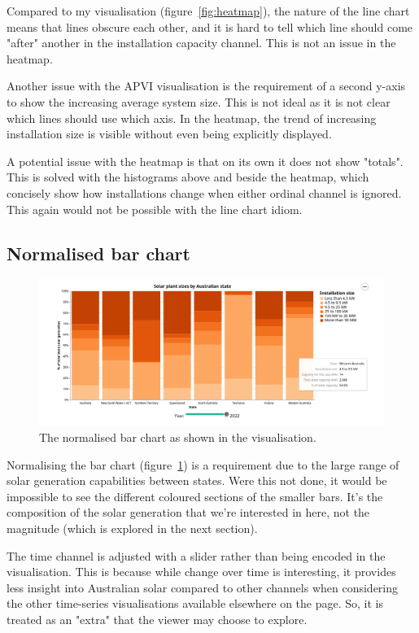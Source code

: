 \documentclass[12pt,letterpaper]{article}
\begin{document}
\begin{multicols}{2}
    Compared to my visualisation (figure~\ref{fig:heatmap}), the nature of the line chart means that lines obscure each other, and it is hard to tell which line should come "after" another in the installation capacity channel. This is not an issue in the heatmap.

    Another issue with the APVI visualisation is the requirement of a second y-axis to show the increasing average system size. This is not ideal as it is not clear which lines should use which axis. In the heatmap, the trend of increasing installation size is visible without even being explicitly displayed.

    A potential issue with the heatmap is that on its own it does not show "totals". This is solved with the histograms above and beside the heatmap, which concisely show how installations change when either ordinal channel is ignored. This again would not be possible with the line chart idiom.

    \subsection*{Normalised bar chart}

    \begin{figure}[H]
        \centering
        \includegraphics[width=\linewidth]{images/bar.png}
        \caption{The normalised bar chart as shown in the visualisation.}
        \label{fig:bar}
    \end{figure}

    Normalising the bar chart (figure~\ref{fig:bar}) is a requirement due to the large range of solar generation capabilities between states. Were this not done, it would be impossible to see the different coloured sections of the smaller bars. It's the composition of the solar generation that we're interested in here, not the magnitude (which is explored in the next section).

    The time channel is adjusted with a slider rather than being encoded in the visualisation. This is because while change over time is interesting, it provides less insight into Australian solar compared to other channels when considering the other time-series visualisations available elsewhere on the page. So, it is treated as an "extra" that the viewer may choose to explore.


\end{multicols}
\end{document}
